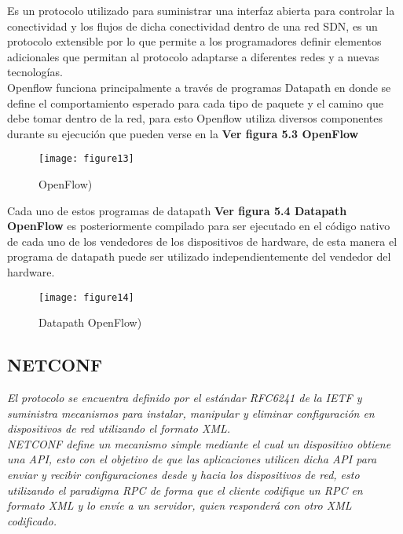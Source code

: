 Es un protocolo utilizado para suministrar una interfaz abierta para controlar la conectividad y los flujos de dicha conectividad dentro de una red SDN, es un protocolo extensible por lo que permite a los programadores definir elementos adicionales que permitan al protocolo adaptarse a diferentes redes y a nuevas tecnologías. 
\\
Openflow funciona principalmente a través de programas Datapath en donde se define el comportamiento esperado para cada tipo de paquete y el camino que debe tomar dentro de la red, para esto Openflow utiliza diversos componentes durante su ejecución que pueden verse en la \textbf{Ver figura 5.3 OpenFlow}
\\
\begin{figure}[htbp]
  \centering
    {\texttt{[image: figure13]}}%
  \caption{OpenFlow)}
  \label{fig:fig2subfig}
\end{figure}
Cada uno de estos programas de datapath \textbf{Ver figura 5.4 Datapath OpenFlow} es posteriormente compilado para ser ejecutado en el código nativo de cada uno de los vendedores de los dispositivos de hardware, de esta manera el programa de datapath puede ser utilizado independientemente del vendedor del hardware.


\begin{figure}[htbp]
  \centering
    {\texttt{[image: figure14]}}%
  \caption{Datapath OpenFlow)}
  \label{fig:fig2subfig}
\end{figure}

\subsection{NETCONF}
\label{sec:NETCONF}

\textit{El protocolo se encuentra definido por el estándar RFC6241 de la IETF y suministra mecanismos para instalar, manipular y eliminar configuración en dispositivos de red utilizando el formato XML.\\
NETCONF define un mecanismo simple mediante el cual un dispositivo obtiene una API, esto con el objetivo de que las aplicaciones utilicen dicha API para enviar y recibir configuraciones desde y hacia los dispositivos de red, esto utilizando el paradigma RPC de forma que el cliente codifique un RPC en formato XML y lo envíe a un servidor, quien responderá con otro XML codificado.}

